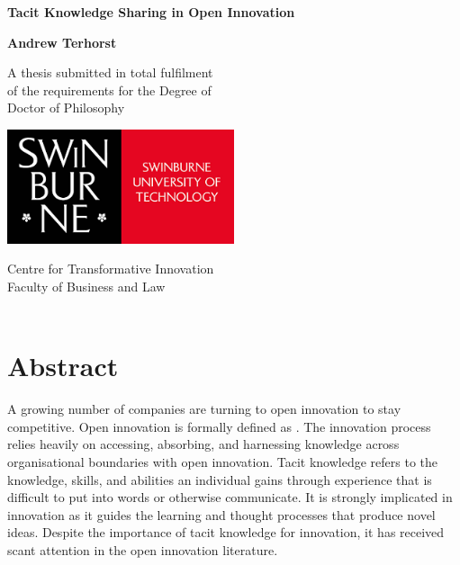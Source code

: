 \documentclass[12pt,table,xcdraw]{book}
\renewcommand{\today}{\the\day \ \monthname \ \the\year}
\begin{document}
\frontmatter

\begin{titlepage}
\renewcommand{\today}{\monthname \ \the\year}
\begin{center}
\vspace*{1cm}

\Huge
\textbf{Tacit Knowledge Sharing in Open Innovation}\\
\vspace{1cm}

\Large
\textbf{Andrew Terhorst}
\vfill

\Large
A thesis submitted in total fulfilment\\
of the requirements for the Degree of \\
Doctor of Philosophy

\vspace{1cm}

\includegraphics[width=0.5\textwidth]{Images/swinburne_university_of_technology.png} 

\vspace{1cm}

\Large
Centre for Transformative Innovation\\
Faculty of Business and Law\\
\today
\end{center}
\end{titlepage}

\doublespacing

\chapter*{Abstract}

A growing number of companies are turning to open innovation to stay competitive. Open innovation is formally defined as  \citep{chesbrough2014explicating}. The innovation process relies heavily on accessing, absorbing, and harnessing knowledge across organisational boundaries with open innovation. Tacit knowledge refers to the knowledge, skills, and abilities an individual gains through experience that is difficult to put into words or otherwise communicate. It is strongly implicated in innovation as it guides the learning and thought processes that produce novel ideas. Despite the importance of tacit knowledge for innovation, it has received scant attention in the open innovation literature. \medskip
\end{document}

